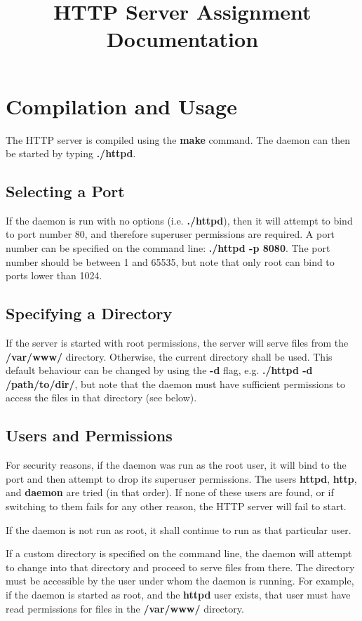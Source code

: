 \documentclass[a4paper]{article}
\title{HTTP Server Assignment \\
  \large Documentation}
\date{}
\author{}
\begin{document}
\maketitle

\section{Compilation and Usage}
The HTTP server is compiled using the \textbf{make} command. The daemon can then
be started by typing \textbf{./httpd}.

\subsection{Selecting a Port}
If the daemon is run with no options (i.e. \textbf{./httpd}), then it will
attempt to bind to port number 80, and therefore superuser permissions are
required. A port number can be specified on the command line: \textbf{./httpd -p
  8080}. The port number should be between 1 and 65535, but note that only root
can bind to ports lower than 1024.

\subsection{Specifying a Directory}
If the server is started with root permissions, the server will serve files from
the \textbf{/var/www/} directory. Otherwise, the current directory shall be
used. This default behaviour can be changed by using the \textbf{-d} flag,
e.g. \textbf{./httpd -d /path/to/dir/}, but note that the daemon must have
sufficient permissions to access the files in that directory (see below).

\subsection{Users and Permissions}
For security reasons, if the daemon was run as the root user, it will bind to
the port and then attempt to drop its superuser permissions. The users
\textbf{httpd}, \textbf{http}, and \textbf{daemon} are tried (in that order). If
none of these users are found, or if switching to them fails for any other
reason, the HTTP server will fail to start.

If the daemon is not run as root, it shall continue to run as that particular
user.

If a custom directory is specified on the command line, the daemon will attempt
to change into that directory and proceed to serve files from there. The
directory must be accessible by the user under whom the daemon is running. For
example, if the daemon is started as root, and the \textbf{httpd} user exists,
that user must have read permissions for files in the \textbf{/var/www/}
directory.
\end{document}

